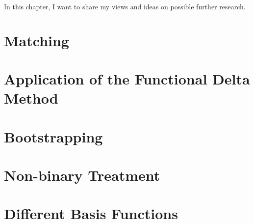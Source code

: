 In this chapter, I want to share my views and ideas on possible further research.
\section{Matching}
  
\section{Application of the Functional Delta Method}
  
\section{Bootstrapping} 
  
\section{Non-binary Treatment}
  
\section{Different Basis Functions}
  
